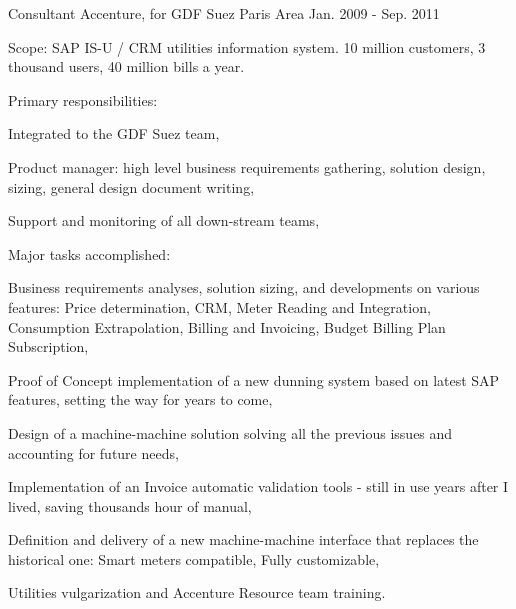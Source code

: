 \begin{cventries}
  \cventry
    {Consultant} %
    {Accenture, for GDF Suez} %
    {Paris Area} %
    {Jan. 2009 - Sep. 2011} %
    {
      \begin{cvitems} %
        \item {Scope: SAP IS-U / CRM utilities information system. 10 million customers, 3 thousand users, 40 million bills a year.}
        \item {Primary responsibilities:}
        \begin{cvsubitems}
          \item {Integrated to the GDF Suez team,}
          \item {Product manager: high level business requirements gathering, solution design, sizing, general design document writing,}
          \item {Support and monitoring of all down-stream teams,}
        \end{cvsubitems}
        \item {Major tasks accomplished:}
        \begin{cvsubitems}
          \item {Business requirements analyses, solution sizing, and developments on various features: Price determination, CRM, Meter Reading and Integration, Consumption Extrapolation, Billing and Invoicing, Budget Billing Plan Subscription,}
          \item {Proof of Concept implementation of a new dunning system based on latest SAP features, setting the way for years to come,}
          \item {Design of a machine-machine solution solving all the previous issues and accounting for future needs,}
          \item {Implementation of an Invoice automatic validation tools - still in use years after I lived, saving thousands hour of manual,}
          \item {Definition and delivery of a new machine-machine interface that replaces the historical one: Smart meters compatible, Fully customizable,}
          \item {Utilities vulgarization and Accenture Resource team training.}
        \end{cvsubitems}
      \end{cvitems}
    }


\end{cventries}
